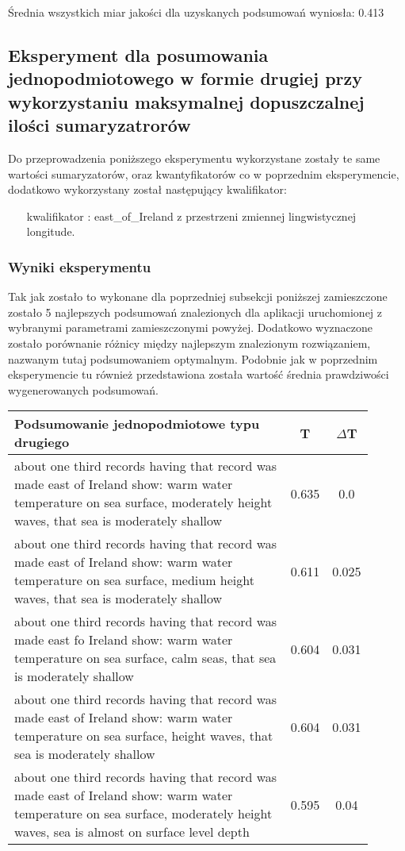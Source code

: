 \documentclass{article}
\begin{document}
\noindent Średnia wszystkich miar jakości dla uzyskanych podsumowań wyniosła: 0.413



\subsection{Eksperyment dla posumowania jednopodmiotowego w formie drugiej przy wykorzystaniu maksymalnej dopuszczalnej ilości sumaryzatrorów}

Do przeprowadzenia poniższego eksperymentu wykorzystane zostały te same wartości sumaryzatorów, oraz kwantyfikatorów co w poprzednim eksperymencie, dodatkowo wykorzystany został następujący kwalifikator:

\begin{itemize}
    \item[kwalifikator]: east\_of\_Ireland z przestrzeni zmiennej lingwistycznej longitude.
\end{itemize}

\subsubsection{Wyniki eksperymentu}

\noindent Tak jak zostało to wykonane dla poprzedniej subsekcji poniższej zamieszczone zostało 5 najlepszych podsumowań znalezionych dla aplikacji uruchomionej z wybranymi parametrami zamieszczonymi powyżej. Dodatkowo wyznaczone zostało porównanie różnicy między najlepszym znalezionym rozwiązaniem, nazwanym tutaj podsumowaniem optymalnym. Podobnie jak w poprzednim eksperymencie tu również przedstawiona została wartość średnia prawdziwości wygenerowanych podsumowań.

\begin{longtable}{|p{0.9\linewidth}|c|c|}
\hline
\textbf{Podsumowanie jednopodmiotowe typu drugiego} & \textbf{T} & \textbf{\(\Delta \)T} \\
\hline
about one third records having that record was made east of Ireland show: warm water temperature on sea surface, moderately height waves, that sea is moderately shallow & 0.635 & 0.0 \\ \hline
about one third records having that record was made east of Ireland show: warm water temperature on sea surface, medium height waves, that sea is moderately shallow & 0.611 & 0.025 \\ \hline
about one third records having that record was made east fo Ireland show: warm water temperature on sea surface, calm seas, that sea is moderately shallow & 0.604 & 0.031 \\ \hline
about one third records having that record was made east of Ireland show: warm water temperature on sea surface, height waves, that sea is moderately shallow & 0.604 & 0.031 \\ \hline
about one third records having that record was made east of Ireland show: warm water temperature on sea surface, moderately height waves, sea is almost on surface level depth & 0.595 & 0.04 \\ \hline
\hline
\end{longtable}
\end{document}

